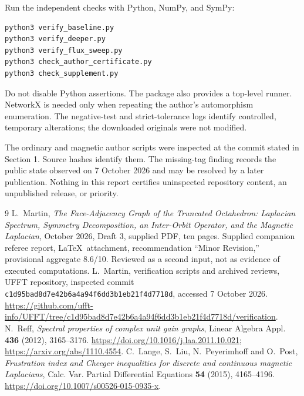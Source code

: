 \documentclass[11pt,a4paper]{article}
\begin{document}
Run the independent checks with Python, NumPy, and SymPy:
\begin{verbatim}
python3 verify_baseline.py
python3 verify_deeper.py
python3 verify_flux_sweep.py
python3 check_author_certificate.py
python3 check_supplement.py
\end{verbatim}
Do not disable Python assertions. The package also provides a top-level runner. NetworkX is needed only when repeating the author's automorphism enumeration. The negative-test and strict-tolerance logs identify controlled, temporary alterations; the downloaded originals were not modified.

The ordinary and magnetic author scripts were inspected at the commit stated in Section 1. Source hashes identify them. The missing-tag finding records the public state observed on 7 October 2026 and may be resolved by a later publication. Nothing in this report certifies uninspected repository content, an unpublished release, or priority.

\begin{thebibliography}{9}
 L.~Martin, \emph{The Face-Adjacency Graph of the Truncated Octahedron: Laplacian Spectrum, Symmetry Decomposition, an Inter-Orbit Operator, and the Magnetic Laplacian}, October 2026, Draft 3, supplied PDF, ten pages.
 Supplied companion referee report, \LaTeX\ attachment, recommendation ``Minor Revision,'' provisional aggregate 8.6/10. Reviewed as a second input, not as evidence of executed computations.
 L.~Martin, verification scripts and archived reviews, UFFT repository, inspected commit \texttt{c1d95bad8d7e42b6a4a94f6dd3b1eb21f4d7718d}, accessed 7 October 2026. \url{https://github.com/ufft-info/UFFT/tree/c1d95bad8d7e42b6a4a94f6dd3b1eb21f4d7718d/verification}.
 N.~Reff, \emph{Spectral properties of complex unit gain graphs}, Linear Algebra Appl. \textbf{436} (2012), 3165--3176. \url{https://doi.org/10.1016/j.laa.2011.10.021}; \url{https://arxiv.org/abs/1110.4554}.
 C.~Lange, S.~Liu, N.~Peyerimhoff and O.~Post, \emph{Frustration index and Cheeger inequalities for discrete and continuous magnetic Laplacians}, Calc. Var. Partial Differential Equations \textbf{54} (2015), 4165--4196. \url{https://doi.org/10.1007/s00526-015-0935-x}.
\end{thebibliography}
\end{document}
